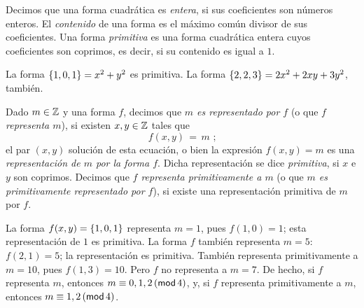 \begin{defDefiniciones}\label{def:definiciones:entera}
	Decimos que una forma cuadr\'atica es \emph{entera},
	si sus coeficientes son n\'umeros enteros.
	El \emph{contenido} de una forma es el m\'aximo com\'un
	divisor de sus coeficientes.
	Una forma \emph{primitiva} es una forma cuadr\'atica
	entera cuyos coeficientes son coprimos, es decir, si
	su contenido es igual a $1$.
\end{defDefiniciones}


\begin{ejemDefiniciones}\label{ejem:definiciones:primitiva}
	La forma $\binaria{1,0,1}=x^2+y^2$ es primitiva.
	La forma $\binaria{2,2,3}=2x^2+2xy+3y^2$, tambi\'en.
\end{ejemDefiniciones}

\begin{defDefiniciones}\label{def:definiciones:representacion}
	Dado $m\in\Enteros$ y una forma $f$, decimos que
	\emph{$m$ es representado por $f$} (o que \emph{$f$ %
	representa $m$}), si existen $x,y\in\Enteros$ tales que
	\begin{displaymath}
		f(x,y)\,=\,m
		\text{ ;}
	\end{displaymath}
	el par $(x,y)$ soluci\'on de esta ecuaci\'on, o bien la
	expresi\'on $f(x,y)=m$ es una \emph{representaci\'on de $m$ %
	por la forma $f$}. Dicha representaci\'on se dice
	\emph{primitiva}, si $x$ e $y$ son coprimos. Decimos que
	\emph{$f$ representa primitivamente a $m$} (o que
	\emph{$m$ es primitivamente representado por $f$}), si
	existe una representaci\'on primitiva de $m$ por $f$.
\end{defDefiniciones}

\begin{ejemDefiniciones}\label{ejem:definiciones:representacion}
	La forma $f(x,y)=\binaria{1,0,1}$ representa $m=1$, pues
	$f(1,0)=1$; esta representaci\'on de $1$ es primitiva. La forma
	$f$ tambi\'en representa $m=5$: $f(2,1)=5$; la representaci\'on
	es primitiva. Tambi\'en representa primitivamente a $m=10$, pues
	$f(1,3)=10$. Pero $f$ no representa a $m=7$. De hecho, si $f$
	representa $m$, entonces $m\equiv 0,1,2\tmodulo[4]$, y, si $f$
	representa primitivamente a $m$, entonces $m\equiv 1,2\tmodulo[4]$.
\end{ejemDefiniciones}

